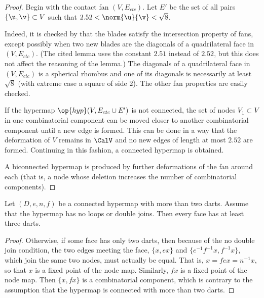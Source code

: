 \begin{proof}
  Begin with the contact fan $(V,E_{ctc})$.  Let $E'$ be the set
  of all pairs $\{\u,\v\}\subset V$ such that
  $2.52<\norm{\u}{\v}<\sqrt8$.

   Indeed, it is checked by
  \cite[Lemma~4.30]{Hales:2006:DCG} that the blades satisfy the
  intersection property of fans, except possibly when two new blades
  are the diagonals of a quadrilateral face in $(V,E_{ctc})$.  (The
  cited lemma uses the constant $2.51$ instead of $2.52$, but this
  does not affect the reasoning of the lemma.)  The diagonals of a quadrilateral face
  in $(V,E_{ctc})$ is a spherical rhombus and one of its diagonals is
  necessarily at least $\sqrt8$ (with extreme case a square of side
  $2$).  The other fan properties are easily checked.

  If the hypermap $\op{hyp}(V,E_{ctc}\cup E')$ is not connected,
  the set of nodes $V_1\subset V$ in one combinatorial component can
  be moved closer to another combinatorial component until a new edge
  is formed.  This can be done in a way that the deformation of $V$
  remains in $\CalV$ and no new edges of length at most $2.52$ are formed.
  Continuing in this fashion, a connected hypermap is obtained.

A biconnected hypermap is produced by  further
 deformations of the fan around each   (that is, a node 
whose deletion increases the number of combinatorial components).
\end{proof}


\begin{lemma}\label{lemma:dj}
Let $(D,e,n,f)$ be a connected hypermap with more than
two darts.  Assume that the hypermap has no loops or double joins. Then
every face has at least three darts.
\end{lemma}

\begin{proof}
  Otherwise, if some face has only two darts, then because of the no
  double join condition, the two edges meeting the face, $\{x, e x\}$
  and $\{ e^{-1} f^{-1} x, f^{-1} x\}$, which join the same two nodes,
 must actually be equal.  That
  is, $ x = f e x = n^{-1} x$, so that $x$ is a fixed point of the node
  map.  Similarly, $f x$ is a fixed point of the node map.  Then $\{x,
  f x\}$ is a combinatorial component, which is contrary to the
  assumption that the hypermap is connected with more than two darts.
\end{proof}


